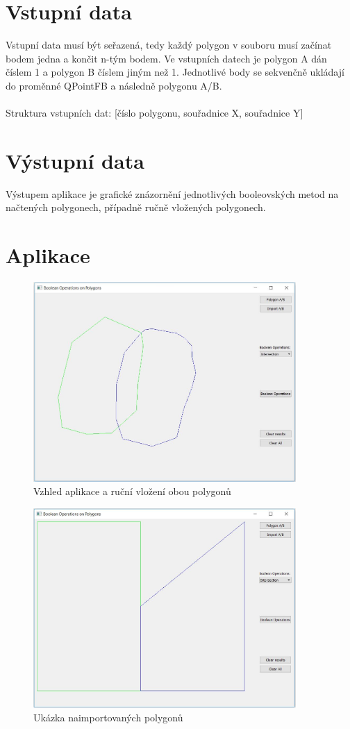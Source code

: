 \documentclass[a4paper, 12pt]{article}
\begin{document}
\section{Vstupní data}
Vstupní data musí být seřazená, tedy každý polygon v souboru musí začínat bodem jedna a končit n-tým bodem.  Ve vstupních datech je polygon A dán číslem 1 a polygon B číslem jiným než 1. Jednotlivé body se sekvenčně ukládají do proměnné QPointFB a následně polygonu A/B.\\
\\
Struktura vstupních dat:
[číslo polygonu, souřadnice X, souřadnice Y]


\section{Výstupní data}
Výstupem aplikace je grafické znázornění jednotlivých booleovských metod na načtených polygonech, případně ručně vložených polygonech.


\clearpage
\section{Aplikace}

\begin{figure}[h!]
\centering
\includegraphics[width=10cm]{pictures/polygons.jpg}
\caption{Vzhled aplikace a ruční vložení obou polygonů}
\end{figure}

\begin{figure}[h!]
\centering
\includegraphics[width=10cm]{pictures/import.jpg}
\caption{Ukázka naimportovaných polygonů}
\end{figure}
\end{document}
